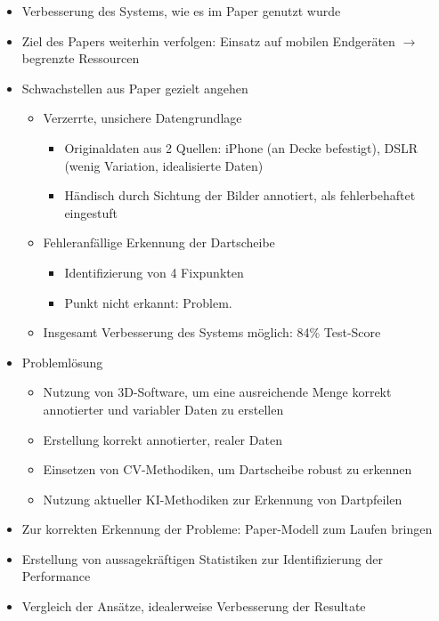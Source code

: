 \begin{itemize}
    \item Verbesserung des Systems, wie es im Paper genutzt wurde \cite{deepdarts}
    \item Ziel des Papers weiterhin verfolgen: Einsatz auf mobilen Endgeräten $\rightarrow$ begrenzte Ressourcen

    \item Schwachstellen aus Paper gezielt angehen
    \begin{itemize}
        \item Verzerrte, unsichere Datengrundlage \cite{deepdarts-data}
        \begin{itemize}
            \item Originaldaten aus 2 Quellen: iPhone (an Decke befestigt), DSLR (wenig Variation, idealisierte Daten)
            \item Händisch durch Sichtung der Bilder annotiert, als fehlerbehaftet eingestuft
        \end{itemize}
        \item Fehleranfällige Erkennung der Dartscheibe
        \begin{itemize}
            \item Identifizierung von 4 Fixpunkten
            \item Punkt nicht erkannt: Problem.
        \end{itemize}
        \item Insgesamt Verbesserung des Systems möglich: 84\% Test-Score
    \end{itemize}

    \item Problemlösung
    \begin{itemize}
        \item Nutzung von 3D-Software, um eine ausreichende Menge korrekt annotierter und variabler Daten zu erstellen
        \item Erstellung korrekt annotierter, realer Daten
        \item Einsetzen von CV-Methodiken, um Dartscheibe robust zu erkennen
        \item Nutzung aktueller KI-Methodiken zur Erkennung von Dartpfeilen
    \end{itemize}

    \item Zur korrekten Erkennung der Probleme: Paper-Modell zum Laufen bringen
    \item Erstellung von aussagekräftigen Statistiken zur Identifizierung der Performance
    \item Vergleich der Ansätze, idealerweise Verbesserung der Resultate

\end{itemize}

\fi

